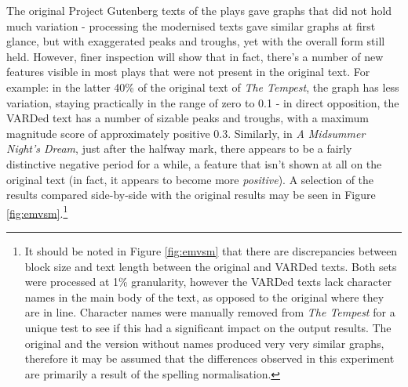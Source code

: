 \documentclass{article}
\begin{document}
{        The original Project Gutenberg texts of the plays gave graphs that did not hold much variation - processing the modernised texts gave similar graphs at first glance, but with exaggerated peaks and troughs, yet with the overall form still held. However, finer inspection will show that in fact, there's a number of new features visible in most plays that were not present in the original text. For example: in the latter 40\% of the original text of \textit{The Tempest}, the graph has less variation, staying practically in the range of zero to 0.1 - in direct opposition, the VARDed text has a number of sizable peaks and troughs, with a maximum magnitude score of approximately positive 0.3. Similarly, in \textit{A Midsummer Night's Dream}, just after the halfway mark, there appears to be a fairly distinctive negative period for a while, a feature that isn't shown at all on the original text (in fact, it appears to become more \textit{positive}). A selection of the results compared side-by-side with the original results may be seen in Figure \ref{fig:emvsm}.\footnote{It should be noted in Figure \ref{fig:emvsm} that there are discrepancies between block size and text length between the original and VARDed texts. Both sets were processed at 1\% granularity, however the VARDed texts lack character names in the main body of the text, as opposed to the original where they are in line. Character names were manually removed from \textit{The Tempest} for a unique test to see if this had a significant impact on the output results. The original and the version without names produced very very similar graphs, therefore it may be assumed that the differences observed in this experiment are primarily a result of the spelling normalisation.}

}
\end{document}
